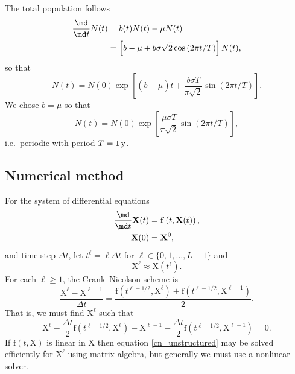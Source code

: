 \documentclass{jpmarticle}
\renewcommand{\vec}[1]{\boldsymbol{\mathrm{#1}}}
\begin{document}
The total population follows
\begin{equation}
  \begin{split}
    \frac{\md}{\md t} N(t)
    &= b(t) N(t) - \mu N(t)
    \\
    &= \left[
      \bar{b} - \mu
      + \bar{b} \sigma \sqrt{2} \cos\left(2 \pi t / T\right)
    \right]
    N(t),
  \end{split}
\end{equation}
so that
\begin{equation}
  N(t) = N(0) \exp\left[
    \left(\bar{b} - \mu\right) t
    + \frac{\bar{b} \sigma T}{\pi \sqrt{2}}
    \sin\left(2 \pi t / T\right)
  \right].
\end{equation}
We chose $\bar{b} = \mu$ so that
\begin{equation}
  N(t) = N(0) \exp\left[
    \frac{\mu \sigma T}{\pi \sqrt{2}}
    \sin\left(2 \pi t / T\right)
  \right],
\end{equation}
i.e.~periodic with period $T = \unit[1]{y}$.


\subsection{Numerical method}

For the system of differential equations
\begin{equation}
  \begin{split}
    \frac{\md}{\md t} \vec{X}(t)
    &= \vec{f}\left(t, \vec{X}(t)\right),
    \\
    \vec{X}(0) &= \vec{X}^0,
  \end{split}
\end{equation}
and time step $\Delta t$, let $t^{\ell} = \ell \Delta t$ for
$\ell \in \{0, 1, \ldots, L - 1\}$ and
\begin{equation}
  \vec{X}^{\ell} \approx \vec{X}(t^{\ell}).
\end{equation}
For each $\ell \geq 1$, the Crank--Nicolson scheme is
\begin{equation}
  \frac{\vec{X}^{\ell} - \vec{X}^{\ell - 1}}{\Delta t}
  = \frac{
    \vec{f}\left(t^{\ell - 1 / 2}, \vec{X}^{\ell}\right)
    + \vec{f}\left(t^{\ell - 1 / 2}, \vec{X}^{\ell - 1}\right)
  }{2}.
\end{equation}
That is, we must find $\vec{X}^{\ell}$ such that
\begin{equation}
  \label{cn_unstructured}
  \vec{X}^{\ell}
  - \frac{\Delta t}{2}
  \vec{f}\left(t^{\ell - 1 / 2}, \vec{X}^{\ell}\right)
  - \vec{X}^{\ell - 1}
  - \frac{\Delta t}{2}
  \vec{f}\left(t^{\ell - 1 / 2}, \vec{X}^{\ell - 1}\right)
  = \vec{0}.
\end{equation}
If $\vec{f}\left(t, \vec{X}\right)$ is linear in
$\vec{X}$ then equation \eqref{cn_unstructured} may be solved
efficiently for $\vec{X}^{\ell}$ using matrix algebra, but generally
we must use a nonlinear solver.
\end{document}

